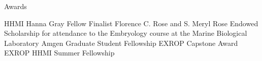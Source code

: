 \begin{rubric}{Awards}

\entry*[2019]
    HHMI Hanna Gray Fellow Finalist
\entry*[2015]
  Florence C. Rose and S. Meryl Rose Endowed Scholarship for attendance to the
  Embryology course at the Marine Biological Laboratory
\entry*[2014]
  Amgen Graduate Student Fellowship
\entry*[2012]
  EXROP Capstone Award
\entry*[2011]
  EXROP HHMI Summer Fellowship

\end{rubric}
